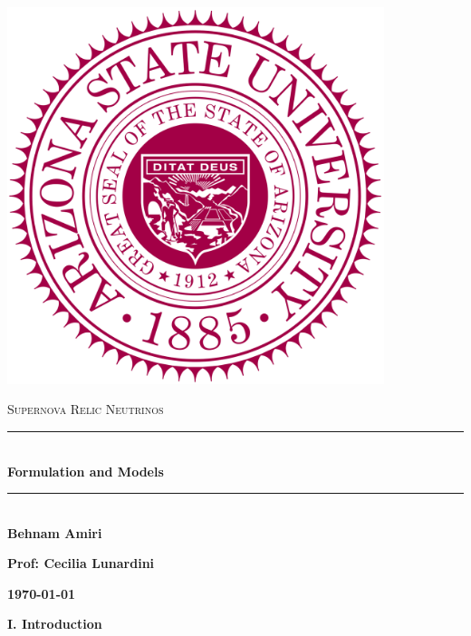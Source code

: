 \documentclass[fleqn]{article}
\begin{document}
  \begin{titlepage}

    \newcommand{\HRule}{\rule{\linewidth}{0.5mm}}

    \center

    \begin{center}
      \includegraphics[height=11cm, width=11cm]{asu.png}
    \end{center}

    \vline

    \textsc{\LARGE Supernova Relic Neutrinos}\\[1.5cm]

    \HRule \\[0.5cm]
    { \huge \bfseries Formulation and Models}\\[0.4cm] 
    \HRule \\[1.0cm]

    \textbf{Behnam Amiri}

    \bigbreak

    \textbf{Prof: Cecilia Lunardini}

    \bigbreak

    \textbf{{\large \today}\\[2cm]}

    \vfill

  \end{titlepage}

  \textbf{I. Introduction}

  \vspace{10px}
\end{document}

